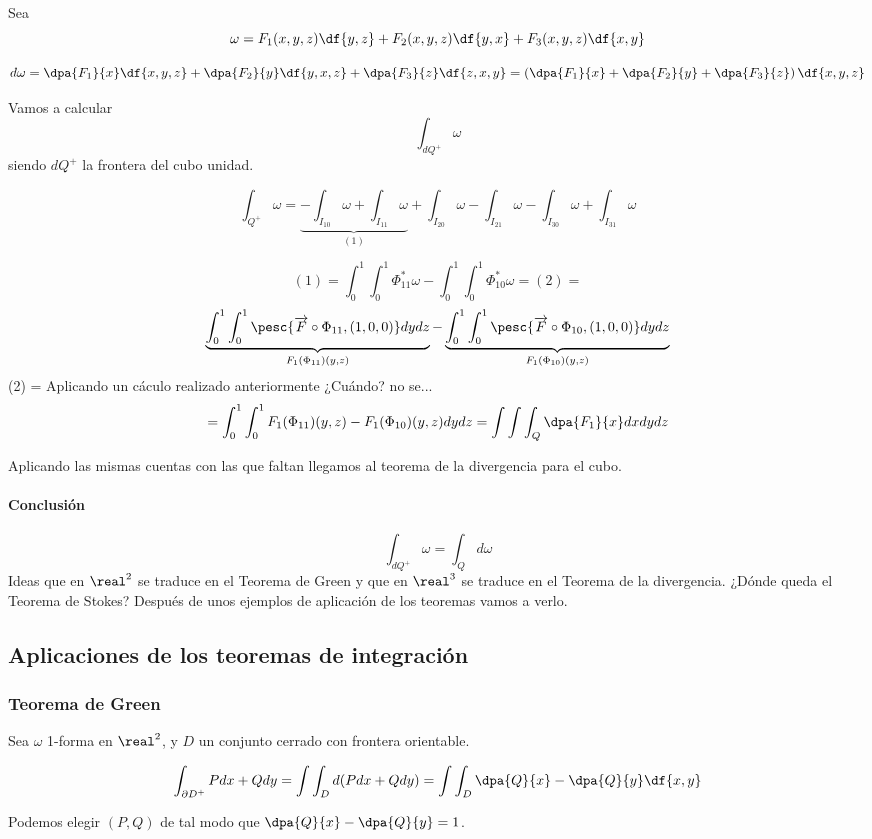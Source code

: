 Sea
\[\omega = F_1(x,y,z)\df{y,z}+F_2(x,y,z)\df{y,x}+F_3(x,y,z)\df{x,y}\]
 
\[d\omega = \dpa{F_1}{x}\df{x,y,z} + \dpa{F_2}{y}\df{y,x,z} + \dpa{F_3}{z}\df{z,x,y} = \left(\dpa{F_1}{x}+\dpa{F_2}{y} + \dpa{F_3}{z}\right) \df{x,y,z}
\]

Vamos a calcular \[\int_{dQ^+} \omega\] siendo $dQ^+$ la frontera del cubo unidad.

\[\int_{Q^+} \omega =\underbrace{ -\int_{I_{10}} \omega +  \int_{I_{11}} \omega}_{(1)} + \int_{I_{20}} \omega -  \int_{I_{21}} \omega  -\int_{I_{30}} \omega +  \int_{I_{31}} \omega\]

\[
(1) = \int_0^1\int_0^1\Phi^{\ast}_{11}\omega - \int_0^1\int_0^1 \Phi^{\ast}_{10} \omega = (2) =\]
\[
 \underbrace{\int_0^1\int_0^1 \pesc{\overrightarrow{F}\circ \Phi_{11},(1,0,0)}dydz}_{F_1(\Phi_{11})(y,z)}
 - \underbrace{ \int_0^1\int_0^1 \pesc{\overrightarrow{F}\circ \Phi_{10},(1,0,0)}dydz}_{F_1(\Phi_{10})(y,z)}
\]
(2) = Aplicando un cáculo realizado anteriormente ¿Cuándo? no se...
\[
= \int_0^1\int_0^1 F_1(\Phi_{11})(y,z)-F_1(\Phi_{10})(y,z)dydz = \int\int\int_Q \dpa{F_1}{x}dxdydz
\]

Aplicando las mismas cuentas con las que faltan llegamos al teorema de la divergencia para el cubo.


\paragraph{Conclusión}
\[\int_{dQ^+} \omega = \int_{Q}d\omega\]
Ideas que en $\real^2$ se traduce en el Teorema de Green y que en $\real^3$ se traduce en el Teorema de la divergencia. ¿Dónde queda el Teorema de Stokes? Después de unos ejemplos de aplicación de los teoremas vamos a verlo.


\subsection{Aplicaciones de los teoremas de integración}
\subsubsection{Teorema de Green}
Sea $\omega$ 1-forma en $\real^2$, y $D$ un conjunto cerrado con frontera orientable.

\[
\int_{\partial  D^+} Pdx+Qdy = \int \int_D d(Pdx+Qdy) = \int\int_D \dpa{Q}{x} - \dpa{Q}{y}\df{x,y}
\]

\obs Podemos elegir $(P,Q)$ de tal modo que $\displaystyle \dpa{Q}{x}-\dpa{Q}{y} = 1$.


